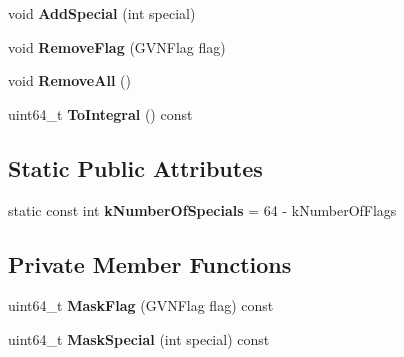 \begin{DoxyCompactItemize}
\item 
void {\bfseries Add\+Special} (int special)\hypertarget{classv8_1_1internal_1_1_side_effects_a6a7829c2ef284243f05b7618f8a4f227}{}\label{classv8_1_1internal_1_1_side_effects_a6a7829c2ef284243f05b7618f8a4f227}

\item 
void {\bfseries Remove\+Flag} (G\+V\+N\+Flag flag)\hypertarget{classv8_1_1internal_1_1_side_effects_a4e287a31e16c5f248b95d208a68c2f95}{}\label{classv8_1_1internal_1_1_side_effects_a4e287a31e16c5f248b95d208a68c2f95}

\item 
void {\bfseries Remove\+All} ()\hypertarget{classv8_1_1internal_1_1_side_effects_a9b999f453cf06ab9c4116080a44c14cc}{}\label{classv8_1_1internal_1_1_side_effects_a9b999f453cf06ab9c4116080a44c14cc}

\item 
uint64\+\_\+t {\bfseries To\+Integral} () const \hypertarget{classv8_1_1internal_1_1_side_effects_a6b8d70e6e613bae7fb314b04643d68e1}{}\label{classv8_1_1internal_1_1_side_effects_a6b8d70e6e613bae7fb314b04643d68e1}

\end{DoxyCompactItemize}
\subsection*{Static Public Attributes}
\begin{DoxyCompactItemize}
\item 
static const int {\bfseries k\+Number\+Of\+Specials} = 64 -\/ k\+Number\+Of\+Flags\hypertarget{classv8_1_1internal_1_1_side_effects_ab9f94b383c9d5e811380e249d01be615}{}\label{classv8_1_1internal_1_1_side_effects_ab9f94b383c9d5e811380e249d01be615}

\end{DoxyCompactItemize}
\subsection*{Private Member Functions}
\begin{DoxyCompactItemize}
\item 
uint64\+\_\+t {\bfseries Mask\+Flag} (G\+V\+N\+Flag flag) const \hypertarget{classv8_1_1internal_1_1_side_effects_ad0b0b9e24ba7317267ad4562b6022ecb}{}\label{classv8_1_1internal_1_1_side_effects_ad0b0b9e24ba7317267ad4562b6022ecb}

\item 
uint64\+\_\+t {\bfseries Mask\+Special} (int special) const \hypertarget{classv8_1_1internal_1_1_side_effects_ac51c78f71177c6518e1f6e124be090ce}{}\label{classv8_1_1internal_1_1_side_effects_ac51c78f71177c6518e1f6e124be090ce}

\end{DoxyCompactItemize}
